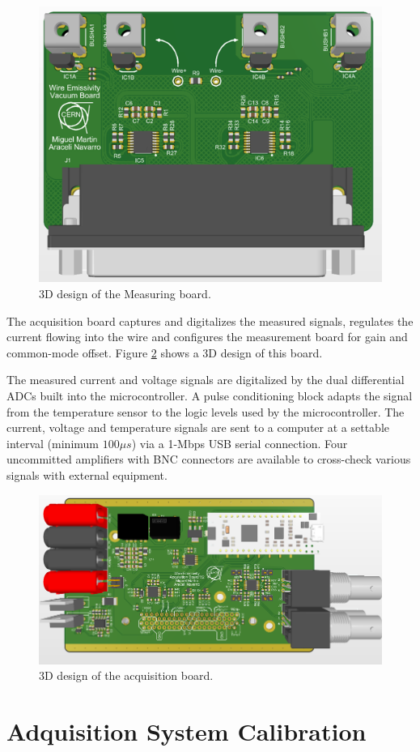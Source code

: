 \begin{figure}[h]
    \centering
    \includegraphics[width=0.5\columnwidth]{3DBoardDesigns/MeasuringBoard.png}
    \caption{3D design of the Measuring board.}
    \label{fig:MeasuringBoard}
\end{figure}

The acquisition board captures and digitalizes the measured signals, regulates the current flowing into the wire and configures the measurement board for gain and common-mode offset. Figure \ref{fig:AdquisitionBoard} shows a 3D design of this board. 

The measured current and voltage signals are digitalized by the dual differential ADCs built into the microcontroller. A pulse conditioning block adapts the signal from the temperature sensor to the logic levels used by the microcontroller. The current, voltage and temperature signals are sent to a computer at a settable interval (minimum $100 \mu s$) via a 1-Mbps USB serial connection. Four uncommitted amplifiers with BNC connectors are available to cross-check various signals with external equipment. 

\begin{figure}[h]
    \centering
    \includegraphics[width=0.8\columnwidth]{3DBoardDesigns/AdquisitionBoard.png}
    \caption{3D design of the acquisition board.}
    \label{fig:AdquisitionBoard}
\end{figure}

\section{Adquisition System Calibration}
\label{sec:ElecCal}

